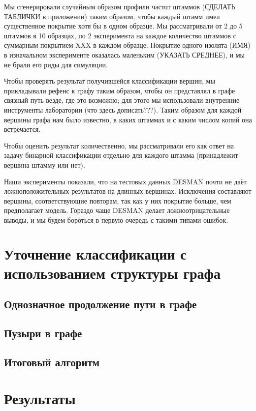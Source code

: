 \documentclass{spbau-diploma}
\begin{document}
Мы сгенерировали случайным образом профили частот штаммов (СДЕЛАТЬ ТАБЛИЧКИ в приложении) таким образом, чтобы каждый штамм имел существенное покрытие хотя бы в одном образце. Мы рассматривали от 2 до 5 штаммов в 10 образцах, по 2 эксперимента на каждое количество штаммов с суммарным покрытием XXX в каждом образце. Покрытие одного изолята (ИМЯ) в изначальном эксперименте оказалась маленьким (УКАЗАТЬ СРЕДНЕЕ), и мы не брали его риды для симуляции.

Чтобы проверять результат получившейся классификации вершин, мы прикладывали рефенс к графу таким образом, чтобы он представлял в графе связный путь везде, где это возможно; для этого мы использовали внутренние инструменты лаборатории (что здесь дописать???). Таким образом для каждой вершины графа нам было известно, в каких штаммах и с каким числом копий она встречается.

Чтобы оценить результат количественно, мы рассматривали его как ответ на задачу бинарной классификации отдельно для каждого штамма (принадлежит вершина штамму или нет).

Наши эксперименты показали, что на тестовых данных DESMAN почти не даёт ложноположительных результатов на длинных вершинах. Исключения составляют вершины, соответствующие повторам, так как у них покрытие больше, чем предполагает модель. Гораздо чаще DESMAN делает ложноотрицательные выводы, и мы будем бороться в первую очередь с такими типами ошибок.



\section{Уточнение классификации с использованием структуры графа}


\subsection{Однозначное продолжение пути в графе}

\subsection{Пузыри в графе}


\subsection{Итоговый алгоритм}


\section{Результаты}
\end{document}
